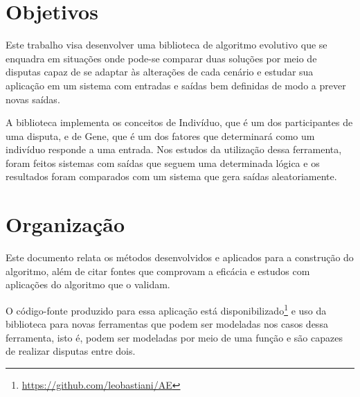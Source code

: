 \section{Objetivos}

Este trabalho visa desenvolver uma biblioteca de algoritmo evolutivo que se enquadra em situações onde pode-se comparar duas soluções por meio de disputas capaz de se adaptar às alterações de cada cenário e estudar sua aplicação em um sistema com entradas e saídas bem definidas de modo a prever novas saídas.

A biblioteca implementa os conceitos de Indivíduo, que é um dos participantes de uma disputa, e de Gene, que é um dos fatores que determinará como um indivíduo responde a uma entrada. Nos estudos da utilização dessa ferramenta, foram feitos sistemas com saídas que seguem uma determinada lógica e os resultados foram comparados com um sistema que gera saídas aleatoriamente.

\section{Organização}

Este documento relata os métodos desenvolvidos e aplicados para a construção do algoritmo, além de citar fontes que comprovam a eficácia e estudos com aplicações do algoritmo que o validam.

O código-fonte produzido para essa aplicação está disponibilizado\footnote{\url{https://github.com/leobastiani/AE}} e uso da biblioteca para novas ferramentas que podem ser modeladas nos casos dessa ferramenta, isto é, podem ser modeladas por meio de uma função \fitness e são capazes de realizar disputas entre dois.
